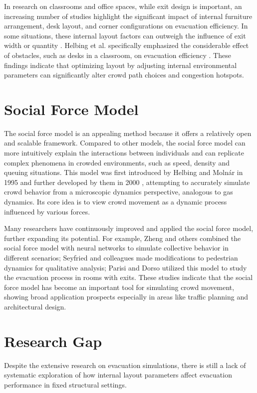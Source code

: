 In research on classrooms and office spaces, while exit design is important, an increasing number of studies highlight the significant impact of internal furniture arrangement, desk layout, and corner configurations on evacuation efficiency. In some situations, these internal layout factors can outweigh the influence of exit width or quantity \cite{liuEvaluatingClassroomEvacuation}. Helbing et al. specifically emphasized the considerable effect of obstacles, such as desks in a classroom, on evacuation efficiency \cite{helbingSimulatingDynamicalFeatures2000}. These findings indicate that optimizing layout by adjusting internal environmental parameters can significantly alter crowd path choices and congestion hotspots.

\section{Social Force Model}
The social force model is an appealing method because it offers a relatively open and scalable framework. Compared to other models, the social force model can more intuitively explain the interactions between individuals and can replicate complex phenomena in crowded environments, such as speed, density and queuing situations. This model was first introduced by Helbing and Molnár in 1995 \cite{helbingSocialForceModel1995} and further developed by them in 2000 \cite{helbingSimulatingDynamicalFeatures2000}, attempting to accurately simulate crowd behavior from a microscopic dynamics perspective, analogous to gas dynamics. Its core idea is to view crowd movement as a dynamic process influenced by various forces.

Many researchers have continuously improved and applied the social force model, further expanding its potential. For example, Zheng and others \cite{zhengModelingCrowdEvacuation2009} combined the social force model with neural networks to simulate collective behavior in different scenarios; Seyfried and colleagues \cite{Seyfried_2006} made modifications to pedestrian dynamics for qualitative analysis; Parisi and Dorso \cite{parisiMicroscopicDynamicsPedestrian2005} utilized this model to study the evacuation process in rooms with exits. These studies indicate that the social force model has become an important tool for simulating crowd movement, showing broad application prospects especially in areas like traffic planning and architectural design.

\section{Research Gap}
Despite the extensive research on evacuation simulations, there is still a lack of systematic exploration of how internal layout parameters affect evacuation performance in fixed structural settings. 

